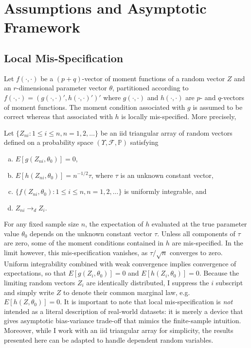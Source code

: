 \section{Assumptions and Asymptotic Framework}
\label{sec:asymp}

\subsection{Local Mis-Specification}
Let $f(\cdot,\cdot)$ be a $(p+q)$-vector of moment functions of a random vector $Z$ and an $r$-dimensional parameter vector $\theta$, partitioned according to $f(\cdot,\cdot) = \left(g(\cdot,\cdot)', h(\cdot,\cdot)'  \right)'$ where $g(\cdot,\cdot)$ and $h(\cdot,\cdot)$ are $p$- and $q$-vectors of moment functions. 
The moment condition associated with $g$ is assumed to be correct whereas that associated with $h$ is locally mis-specified.
More precisely, 
\begin{assump}
\label{assump:drift}
Let $\{Z_{ni}\colon 1\leq i \leq n, n =1, 2, \hdots\}$ be an iid triangular array of random vectors defined on a probability space $(\Upsilon, \mathcal{F}, \mathbb{P})$ satisfying
	\begin{enumerate}[(a)]
		\item $E[g(Z_{ni},\theta_0)] = 0$,
		\item $E[h(Z_{ni},\theta_0)] = n^{-1/2}\tau$, where $\tau$ is an unknown constant vector, 
		\item $\{f(Z_{ni},\theta_0)\colon 1\leq i \leq n, n = 1, 2, \hdots\}$ is uniformly integrable, and
		\item $Z_{ni} \rightarrow_d Z_i$.
	\end{enumerate}
\end{assump}
For any fixed sample size $n$, the expectation of $h$ evaluated at the true parameter value $\theta_0$ depends on the unknown constant vector $\tau$. 
Unless all components of $\tau$ are zero, some of the moment conditions contained in $h$ are mis-specified. In the limit however, this mis-specification vanishes, as $\tau/\sqrt{n}$ converges to zero. 
Uniform integrability combined with weak convergence implies convergence of expectations, so that $E[g(Z_i, \theta_0)]=0$ and $E[h(Z_i, \theta_0)]=0$. Because the limiting random vectors $Z_i$ are identically distributed, I suppress the $i$ subscript and simply write $Z$ to denote their common marginal law, e.g.\ $E[h(Z,\theta_0)]=0$. 
It is important to note that local mis-specification is \emph{not} intended as a literal description of real-world datasets: it is merely a device that gives asymptotic bias-variance trade-off that mimics the finite-sample intuition.
Moreover, while I work with an iid triangular array for simplicity, the results presented here can be adapted to handle dependent random variables.

